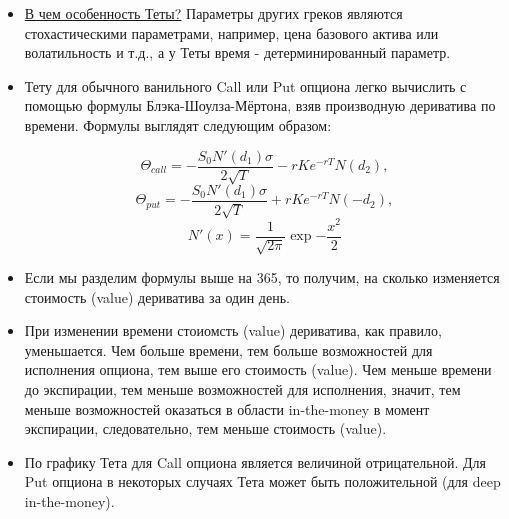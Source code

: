 \documentclass{article}
\begin{document}
\begin{itemize}
\item \underline{В чем особенность Теты?} Параметры других греков являются стохастическими параметрами, например, цена базового актива или волатильность и т.д., а у Теты время - детерминированный параметр.
 
 \item Тету для обычного ванильного Call или Put опциона легко вычислить с помощью формулы Блэка-Шоулза-Мёртона, взяв производную дериватива по времени. Формулы выглядят следующим образом:
 
 $$\Theta_{call} = -\dfrac{S_0 N'(d_1) \sigma}{2 \sqrt{T}} - rKe^{-rT}N(d_2),$$
 $$\Theta_{put} = -\dfrac{S_0 N'(d_1) \sigma}{2 \sqrt{T}} + rKe^{-rT}N(-d_2),$$
 $$N'(x) = \dfrac{1}{\sqrt{2\pi}} \exp{-\frac{x^2}{2}}$$
 
 \item Если мы разделим формулы выше на 365, то получим, на сколько изменяется стоимость (value) дериватива за один день.
 
\item При изменении времени стоиомсть (value) дериватива, как правило, уменьшается. Чем больше времени, тем больше возможностей для исполнения опциона, тем выше его стоимость (value). Чем меньше времени до экспирации, тем меньше возможностей для исполнения, значит, тем меньше возможностей оказаться в области in-the-money в момент экспирации, следовательно, тем меньше стоимость (value).

\item По графику Тета для Call опциона является величиной отрицательной. Для Put опциона в некоторых случаях Тета может быть положительной (для deep in-the-money).



\end{itemize}
\end{document}
